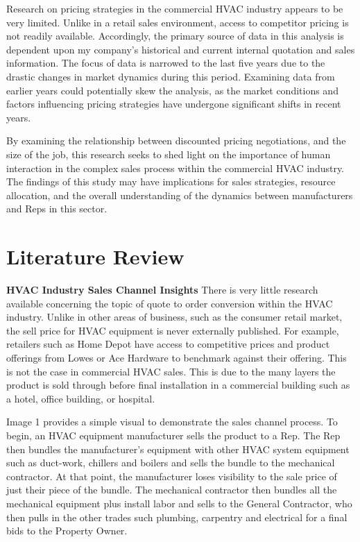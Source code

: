 \documentclass[12pt,english]{article}
\begin{document}
Research on pricing strategies in the commercial HVAC industry appears to be very limited. Unlike in a retail sales environment, access to competitor pricing is not readily available. Accordingly, the primary source of data in this analysis is dependent upon my company's historical and current internal quotation and sales information. The focus of data is narrowed to the last five years due to the drastic changes in market dynamics during this period. Examining data from earlier years could potentially skew the analysis, as the market conditions and factors influencing pricing strategies have undergone significant shifts in recent years. 

By examining the relationship between discounted pricing negotiations, and the size of the job, this research seeks to shed light on the importance of human interaction in the complex sales process within the commercial HVAC industry. The findings of this study may have implications for sales strategies, resource allocation, and the overall understanding of the dynamics between manufacturers and Reps in this sector.

\section{Literature Review}

\textbf{HVAC Industry Sales Channel Insights}
There is very little research available concerning the topic of quote to order conversion within the HVAC industry. Unlike in other areas of business, such as the consumer retail market, the sell price for HVAC equipment is never externally published. For example, retailers such as Home Depot have access to competitive prices and product offerings from Lowes or Ace Hardware to benchmark against their offering. This is not the case in commercial HVAC sales. This is due to the many layers the product is sold through before final installation in a commercial building such as a hotel, office building, or hospital. 

Image 1\cite{1} provides a simple visual to demonstrate the sales channel process. To begin, an HVAC equipment manufacturer sells the product to a Rep. The Rep then bundles the manufacturer's equipment with other HVAC system equipment such as duct-work, chillers and boilers and sells the bundle to the mechanical contractor. At that point, the manufacturer loses visibility to the sale price of just their piece of the bundle. The mechanical contractor then bundles all the mechanical equipment plus install labor and sells to the General Contractor, who then pulls in the other trades such plumbing, carpentry and electrical for a final bids to the Property Owner. 
\end{document}
